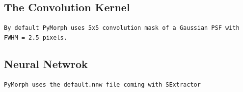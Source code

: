 \documentclass[a4paper,12pt]{article}
\begin{document}
\subsection{The Convolution Kernel}
\begin{footnotesize}
\begin{verbatim}
By default PyMorph uses 5x5 convolution mask of a Gaussian PSF with FWHM = 2.5 pixels.
\end{verbatim}
\end{footnotesize}
\subsection{Neural Netwrok}
\begin{footnotesize}
\begin{verbatim}
PyMorph uses the default.nnw file coming with SExtractor
\end{verbatim}
\end{footnotesize}
\end{document}
